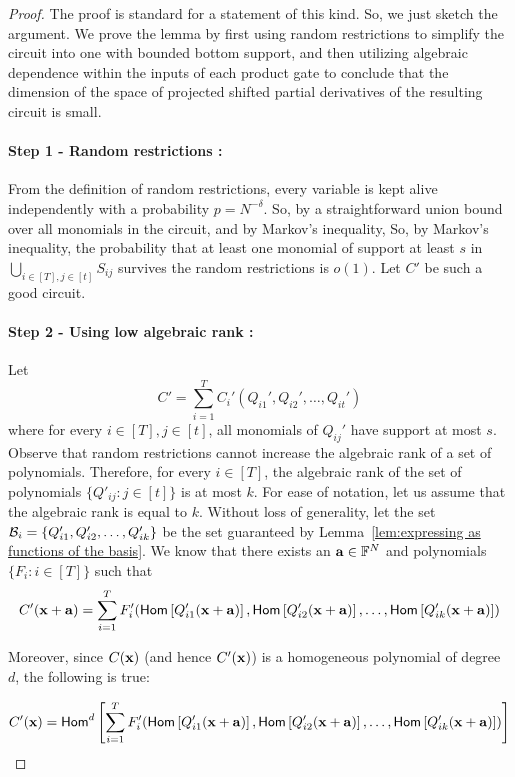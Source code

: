 \begin{proof}
The proof is standard for a statement of this kind. So, we just sketch the argument. 
We prove the lemma by first using random restrictions to simplify the circuit into one with bounded bottom support, and then utilizing algebraic dependence within the inputs of each product gate to conclude that the dimension of the space of projected shifted partial derivatives of the resulting circuit is small.

\paragraph{Step 1 - Random restrictions :}
From the definition of random restrictions, every variable is kept alive independently with a probability $p = N^{-\delta}$. So, by a straightforward union bound over all monomials in the circuit, and by Markov's inequality, 
So, by Markov's inequality, the probability that at least one monomial of support at least $s$ in $\bigcup_{i \in [T], j \in [t]} S_{ij} $ survives the random restrictions is $o(1)$. Let $C'$ be such a good circuit. 

\paragraph{Step 2 - Using low algebraic rank :}
Let 
$$C' = \sum_{i = 1}^T  C_{i}'(Q_{i1}', Q_{i2}', \ldots, Q_{it}') $$
where for every $i \in [T], j \in [t]$, all monomials of $Q_{ij}'$ have support at most $s$. Observe that random restrictions cannot increase the algebraic rank of a set of polynomials. Therefore, for every $i \in [T]$, the algebraic rank of the set of polynomials $\{Q'_{ij} : j \in [t]\}$ is at most $k$. For ease of notation, let us assume that the algebraic rank is equal to $k$. Without loss of generality, let the set ${\cal B}_i = \{Q'_{i1}, Q'_{i2}, \ldots, Q'_{ik}\}$ be the set guaranteed by  Lemma~\ref{lem:expressing as functions of the basis}. We know that there exists an $\mathbf{a}\in \mathbb{F}^{N}$ and polynomials $\{F_i : i \in [T]\}$ such that 
 $$C'(\mathbf{x} + \mathbf{a}) = \sum_{i = 1}^T  F_{i}'(\mathsf{Hom}\left[ Q_{i1}'(\mathbf{x} + \mathbf{a})\right], \mathsf{Hom}\left[ Q_{i2}'(\mathbf{x} + \mathbf{a})\right], \ldots, \mathsf{Hom}\left[ Q_{ik}'(\mathbf{x} + \mathbf{a})\right]) $$

Moreover, since $C(\mathbf{x})$ (and hence $C'(\mathbf{x})$) is a homogeneous polynomial of degree $d$, the following is true: 

\begin{equation}\label{eqn: 1 in lower bound}
C'(\mathbf{x}) = \mathsf{Hom}^{d} \left[\sum_{i = 1}^T  F_{i}'(\mathsf{Hom}\left[ Q_{i1}'(\mathbf{x} + \mathbf{a})\right], \mathsf{Hom}\left[ Q_{i2}'(\mathbf{x} + \mathbf{a})\right], \ldots, \mathsf{Hom}\left[ Q_{ik}'(\mathbf{x} + \mathbf{a})\right])\right]
\end{equation}


\end{proof}
